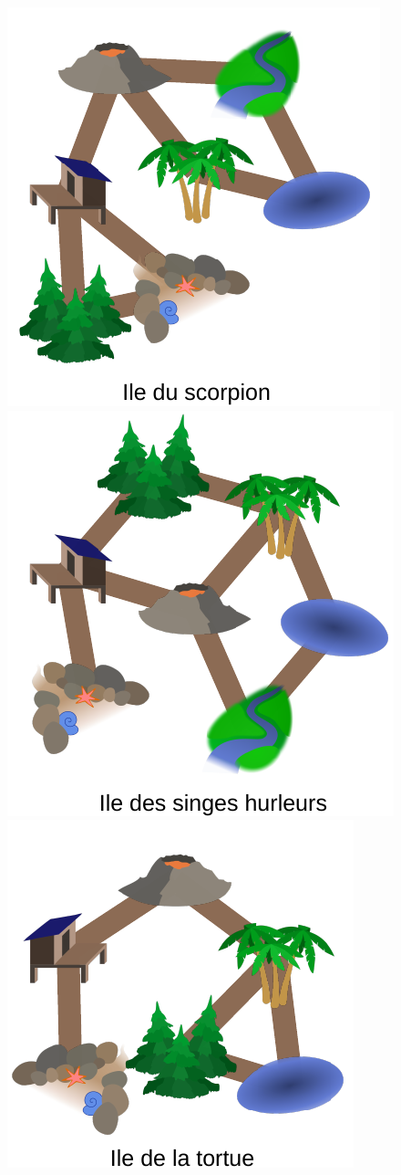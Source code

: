 \documentclass[french, landscape]{article}
\begin{document}
\newpage\includegraphics[height=\textheight]{iles/svgs/logique/6_scorpion.pdf}
\newpage\includegraphics[height=\textheight]{iles/svgs/logique/4_singes-hurleurs.pdf}
\includegraphics[height=\textheight]{iles/svgs/logique/3_tortue.pdf}
\end{document}
